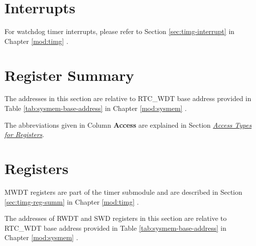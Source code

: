 \documentclass[main\_\_EN.tex]{subfiles}
\begin{document}
\section{Interrupts}

For watchdog timer interrupts, please refer to Section \ref{sec:timg-interrupt} \textit{} in Chapter \ref{mod:timg} \textit{}.



\section{Register Summary}\label{sec:wdt-reg-summ}

The addresses in this section are relative to RTC\_WDT base address provided in Table \ref{tab:sysmem-base-address} in Chapter \ref{mod:sysmem} \textit{}.


The abbreviations given in Column \textbf{Access} are explained in Section \hyperref[glossary-access-types]{\textit{Access Types for Registers}}.



\section{Registers}

MWDT registers are part of the timer submodule and are described in Section \ref{sec:timg-reg-summ} \textit{} in Chapter \ref{mod:timg} \textit{}.

The addresses of RWDT and SWD registers in this section are relative to RTC\_WDT base address provided in Table \ref{tab:sysmem-base-address} in Chapter \ref{mod:sysmem} \textit{}.



\end{document}
